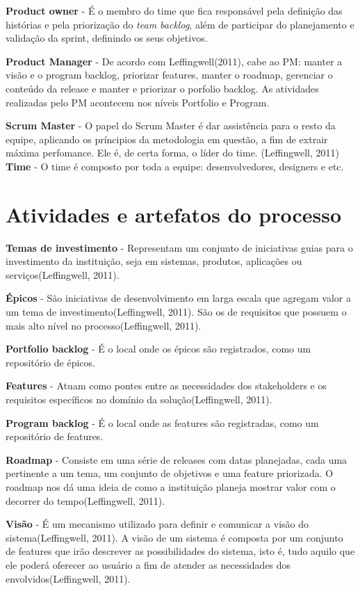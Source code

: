 \textbf{Product owner} - É o membro do time que fica responsável pela definição das histórias e pela priorização do 
\textit{team backlog}, além de participar do planejamento e validação da sprint, definindo os seus objetivos.

\textbf{Product Manager} - De acordo com Leffingwell(2011), cabe ao PM: manter a visão e o program backlog, priorizar features, manter o roadmap, gerenciar o conteúdo da release e manter e priorizar o porfolio backlog. As atividades realizadas pelo PM acontecem nos níveis Portfolio e Program.

\textbf{Scrum Master} - O papel do Scrum Master é dar assistência para o resto da equipe, aplicando os príncipios da metodologia em questão, a fim de extrair máxima perfomance. Ele é, de certa forma, o líder do time. (Leffingwell, 2011)
\textbf{Time} - O time é composto por toda a equipe: desenvolvedores, designers e etc.
\section{Atividades e artefatos do processo}
\textbf{Temas de investimento} - Representam um conjunto de iniciativas guias para o investimento da instituição, seja em sistemas, produtos, aplicações ou serviços(Leffingwell, 2011).

\textbf{Épicos} - São iniciativas de desenvolvimento em larga escala que agregam valor a um tema de investimento(Leffingwell, 2011). São os de requisitos que possuem o mais alto nível no processo(Leffingwell, 2011).

\textbf{Portfolio backlog} - É o local onde os épicos são registrados, como um repositório de épicos.

\textbf{Features} - Atuam como pontes entre as necessidades dos stakeholders e os requisitos específicos no domínio da solução(Leffingwell, 2011).

\textbf{Program backlog} - É o local onde as features são registradas, como um repositório de features.

\textbf{Roadmap} - Consiste em uma série de releases com datas planejadas, cada uma pertinente a um tema, um conjunto de objetivos e uma feature priorizada. O roadmap nos dá uma ideia de como a instituição planeja mostrar valor com o decorrer do tempo(Leffingwell, 2011).

\textbf{Visão} - É um mecanismo utilizado para definir e comunicar a visão do sistema(Leffingwell, 2011). A visão de um sistema é composta por um conjunto de features que irão descrever as possibilidades do sistema, isto é, tudo aquilo que ele poderá oferecer ao usuário a fim de atender as necessidades dos envolvidos(Leffingwell, 2011).

